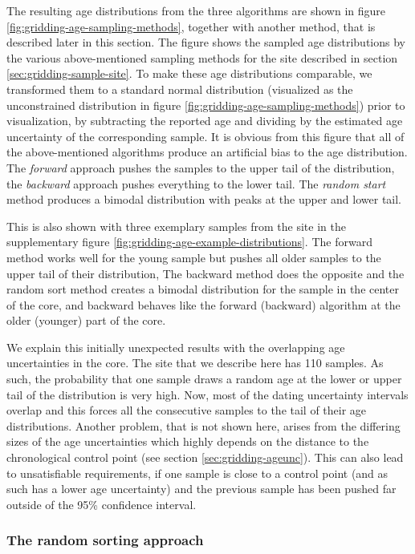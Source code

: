 \begin{refsection}
The resulting age distributions from the three algorithms are shown in figure \ref{fig:gridding-age-sampling-methods}, together with another method, that is described later in this section. The figure shows the sampled age distributions by the various above-mentioned sampling methods for the site described in section \ref{sec:gridding-sample-site}. To make these age distributions comparable, we transformed them to a standard normal distribution (visualized as the unconstrained distribution in figure \ref{fig:gridding-age-sampling-methods}) prior to visualization, by subtracting the reported age and dividing by the estimated age uncertainty of the corresponding sample. It is obvious from this figure that all of the above-mentioned algorithms produce an artificial bias to the age distribution. The \textit{forward} approach pushes the samples to the upper tail of the distribution, the \textit{backward} approach pushes everything to the lower tail. The \textit{random start} method produces a bimodal distribution with peaks at the upper and lower tail.

This is also shown with three exemplary samples from the site in the supplementary figure \ref{fig:gridding-age-example-distributions}. The forward method works well for the young sample but pushes all older samples to the upper tail of their distribution, The backward method does the opposite and the random sort method creates a bimodal distribution for the sample in the center of the core, and backward behaves like the forward (backward) algorithm at the older (younger) part of the core.

We explain this initially unexpected results with the overlapping age uncertainties in the core. The site that we describe here has 110 samples. As such, the probability that one sample draws a random age at the lower or upper tail of the distribution is very high. Now, most of the dating uncertainty intervals overlap and this forces all the consecutive samples to the tail of their age distributions. Another problem, that is not shown here, arises from the differing sizes of the age uncertainties which highly depends on the distance to the chronological control point (see section \ref{sec:gridding-ageunc}). This can also lead to unsatisfiable requirements, if one sample is close to a control point (and as such has a lower age uncertainty) and the previous sample has been pushed far outside of the 95\% confidence interval.


\subsubsection{The random sorting approach}


\end{refsection}
